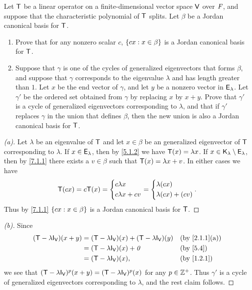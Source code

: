 \begin{ex}\label{ex:7.2.8}
  Let \(\mathsf{T}\) be a linear operator on a finite-dimensional vector space \(\mathsf{V}\) over \(\mathit{F}\), and suppose that the characteristic polynomial of \(\mathsf{T}\) splits.
  Let \(\beta\) be a Jordan canonical basis for \(\mathsf{T}\).
  \begin{enumerate}
    \item Prove that for any nonzero scalar \(c\), \(\left\lbrace cx : x \in \beta\right\rbrace\) is a Jordan canonical basis for \(\mathsf{T}\).
    \item Suppose that \(\gamma\) is one of the cycles of generalized eigenvectors that forms \(\beta\), and suppose that \(\gamma\) corresponds to the eigenvalue \(\lambda\) and has length greater than \(1\).
          Let \(x\) be the end vector of \(\gamma\), and let \(y\) be a nonzero vector in \(\mathsf{E}_{\lambda}\).
          Let \(\gamma'\) be the ordered set obtained from \(\gamma\) by replacing \(x\) by \(x + y\).
          Prove that \(\gamma'\) is a cycle of generalized eigenvectors corresponding to \(\lambda\), and that if \(\gamma'\) replaces \(\gamma\) in the union that defines \(\beta\), then the new union is also a Jordan canonical basis for \(\mathsf{T}\).
  \end{enumerate}
\end{ex}

\begin{proof}[(a)]
  Let \(\lambda\) be an eigenvalue of \(\mathsf{T}\) and let \(x \in \beta\) be an generalized eigenvector of \(\mathsf{T}\) corresponding to \(\lambda\).
  If \(x \in \mathsf{E}_{\lambda}\), then by \cref{5.1.2} we have \(\mathsf{T}(x) = \lambda x\).
  If \(x \in \mathsf{K}_{\lambda} \setminus \mathsf{E}_{\lambda}\), then by \cref{7.1.1} there exists a \(v \in \beta\) such that \(\mathsf{T}(x) = \lambda x + v\).
  In either cases we have
  \[
    \mathsf{T}(cx) = c \mathsf{T}(x) = \begin{dcases}
      c \lambda x \\
      c \lambda x + cv
    \end{dcases} = \begin{dcases}
      \lambda (cx) \\
      \lambda (cx) + (cv)
    \end{dcases}.
  \]
  Thus by \cref{7.1.1} \(\left\lbrace cx : x \in \beta\right\rbrace\) is a Jordan canonical basis for \(\mathsf{T}\).
\end{proof}

\begin{proof}[(b)]
  Since
  \begin{align*}
    (\T - \lambda \IT[\V])(x + y) & = (\T - \lambda \IT[\V])(x) + (\T - \lambda \IT[\V])(y) &  & \by{2.1.1}[a] \\
                                  & = (\T - \lambda \IT[\V])(x) + \zv                       &  & \by{5.4}      \\
                                  & = (\T - \lambda \IT[\V])(x),                            &  & \by{1.2.1}
  \end{align*}
  we see that \((\T - \lambda \IT[\V])^p(x + y) = (\T - \lambda \IT[\V])^p(x)\) for any \(p \in \mathbb{Z}^+\).
  Thus \(\gamma'\) is a cycle of generalized eigenvectors corresponding to \(\lambda\), and the rest claim follows.
\end{proof}


